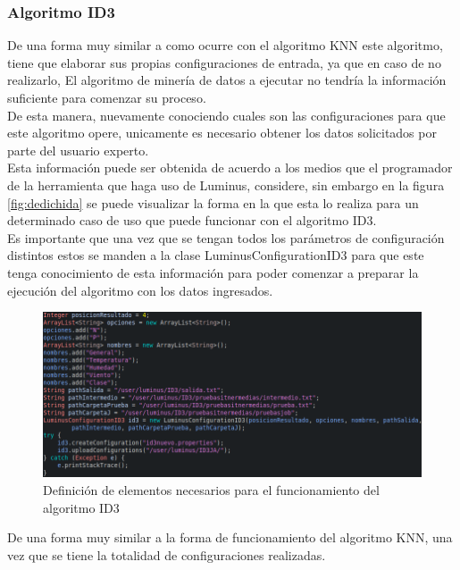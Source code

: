 \subsubsection{Algoritmo ID3}
De una forma muy similar a como ocurre con el algoritmo KNN este algoritmo, tiene que elaborar sus propias configuraciones de entrada, ya que en caso de no realizarlo, El algoritmo de minería de datos a ejecutar no tendría la información suficiente para comenzar su proceso.\\
De esta manera, nuevamente conociendo cuales son las configuraciones para que este algoritmo opere, unicamente es necesario obtener los datos solicitados por parte del usuario experto.\\
Esta información puede ser obtenida de acuerdo a los medios que el programador de la herramienta que haga uso de Luminus, considere, sin embargo en la figura \ref{fig:dedichida} se puede visualizar la forma en la que esta lo realiza para un determinado caso de uso que puede funcionar con el algoritmo ID3.
\\
Es importante que una vez que se tengan todos los parámetros de configuración distintos estos se manden a la clase LuminusConfigurationID3 para que este tenga conocimiento de esta información para poder comenzar a preparar la ejecución del algoritmo con los datos ingresados.\\
\begin{figure}[H]
	\begin{center}
		\hypertarget{fig:defichida}{\hspace{1pt}}
		\includegraphics[width=1\textwidth]{capitulo4b/images/id3setup.png}
		\caption{Definición de elementos necesarios para el funcionamiento del algoritmo ID3}
		\label{fig:defichida}
	\end{center}
\end{figure}
De una forma muy similar a la forma de funcionamiento del algoritmo KNN, una vez que se tiene la totalidad de configuraciones realizadas. \\
